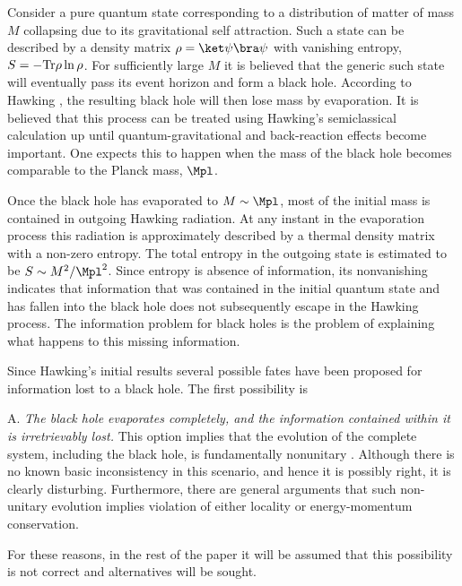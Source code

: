 {}
\itemskip
Consider a pure quantum state
corresponding to a distribution of matter of
mass $M$ collapsing due to its gravitational self attraction.  Such a
state can be described by a density matrix $\rho=\ket\psi\bra\psi$
with vanishing entropy, $S=-{\rm Tr}\rho\ln\rho$.  For sufficiently
large $M$ it is believed that the generic such state will eventually
pass its event horizon and form a black hole.  According to
Hawking ,
the resulting black hole will then lose mass by evaporation.  It is
believed that this process can be treated using Hawking's semiclassical
calculation up until quantum-gravitational and back-reaction
effects become important.  One expects this to happen when
the mass of the black hole becomes comparable to the Planck mass, $\Mpl$.

Once the black hole has evaporated to $M\sim\Mpl$, most of
the initial mass is contained in outgoing Hawking radiation.  At
any instant in the evaporation process this radiation is approximately
described
by a
thermal density matrix with a non-zero entropy.  The total entropy in
the outgoing state is estimated to be
$S\sim M^2/\Mpl^2$.  Since entropy is absence of information,
its nonvanishing indicates that information
that was contained in
the initial quantum state and has fallen into the black hole does
not subsequently escape in the Hawking process.  The information
problem for black holes is the problem of explaining what happens to
this missing information.

Since Hawking's initial results several possible fates have been proposed
for information
lost to a black hole.
The first possibility is

\itemskip
\item{A.}  {\it The black hole evaporates completely, and the information
contained within it is irretrievably lost.}
\itemskip
This option implies that the
evolution of the complete system, including the black hole, is
fundamentally nonunitary .  Although there is no known basic
inconsistency in this scenario, and hence it is possibly right, it
is clearly disturbing. Furthermore,
there are general arguments  that such non-unitary
evolution implies violation of either locality or energy-momentum
conservation.

For these reasons, in the rest of the paper it will
be assumed that this possibility is not correct and alternatives will
be sought.


